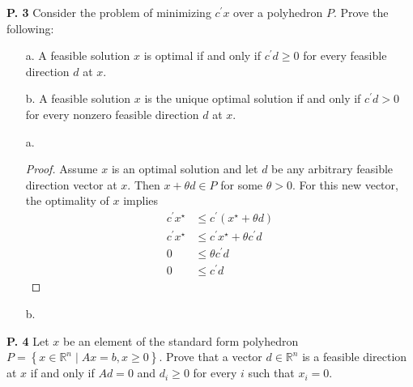 \documentclass{article}
\begin{document}
\begin{jacklist}
\newpage
    \begin{framed} 
    \item [\textbf{P. 3}] Consider the problem of minimizing $c^{\prime} x$ over a polyhedron $P$. Prove the following:
        \begin{itemize}
            \item [a.] A feasible solution $x$ is optimal if and only if $c^{\prime} d \geq 0$ for every feasible direction $d$ at $x$. 
            \item [b.] A feasible solution $x$ is the unique optimal solution if and only if $c^{\prime} d>0$ 
                for every nonzero feasible direction $d$ at $x$. 
        \end{itemize}
    \end{framed}
    \begin{itemize}
        \item [a.] 
            \begin{proof}
                Assume $x$ is an optimal solution and let $d$ be any arbitrary feasible direction vector at $x$. Then $x + \theta d 
                \in P$ for some $\theta > 0$. For this new vector, the optimality of $x$ implies 
                \begin{align*}
                    c^\prime x^\star &\leq c^\prime(x^\star + \theta d) \\
                    c^\prime x^\star &\leq c^\prime x^\star + \theta c^\prime d \\
                    0 &\leq \theta c^\prime d \\
                    0 &\leq c^\prime d
                \end{align*}
            \end{proof}
        \item [b.]
    \end{itemize}

\newpage
    \begin{framed} 
    \item [\textbf{P. 4}] Let $x$ be an element of the standard form polyhedron 
        $P=\left\{x \in \mathbb{R}^{n} \mid A x=b, x \geq 0\right\}$. Prove that a vector $d \in \mathbb{R}^{n}$ is a feasible 
        direction at $x$ if and only if $A d=0$ and $d_{i} \geq 0$ for every $i$ such that $x_{i}=0$.
    \end{framed}


\end{jacklist}
\end{document}
